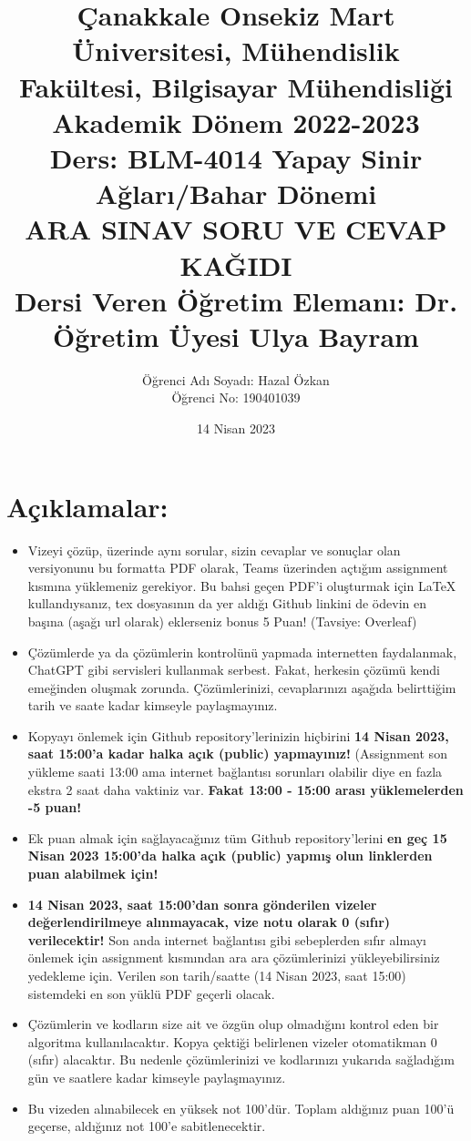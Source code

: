 \documentclass[11pt]{article}
\title{Çanakkale Onsekiz Mart Üniversitesi, Mühendislik Fakültesi, Bilgisayar Mühendisliği Akademik Dönem 2022-2023\\
Ders: BLM-4014 Yapay Sinir Ağları/Bahar Dönemi\\ 
ARA SINAV SORU VE CEVAP KAĞIDI\\
Dersi Veren Öğretim Elemanı: Dr. Öğretim Üyesi Ulya Bayram}
\author{%
\begin{minipage}{\textwidth}
\raggedright
Öğrenci Adı Soyadı: Hazal Özkan\\ %
Öğrenci No: 190401039
\end{minipage}%
}
\date{14 Nisan 2023}
\begin{document}
\maketitle

\vspace{-.5in}
\section*{Açıklamalar:}
\begin{itemize}
    \item Vizeyi çözüp, üzerinde aynı sorular, sizin cevaplar ve sonuçlar olan versiyonunu bu formatta PDF olarak, Teams üzerinden açtığım assignment kısmına yüklemeniz gerekiyor. Bu bahsi geçen PDF'i oluşturmak için LaTeX kullandıysanız, tex dosyasının da yer aldığı Github linkini de ödevin en başına (aşağı url olarak) eklerseniz bonus 5 Puan! (Tavsiye: Overleaf)
    \item Çözümlerde ya da çözümlerin kontrolünü yapmada internetten faydalanmak, ChatGPT gibi servisleri kullanmak serbest. Fakat, herkesin çözümü kendi emeğinden oluşmak zorunda. Çözümlerinizi, cevaplarınızı aşağıda belirttiğim tarih ve saate kadar kimseyle paylaşmayınız. 
    \item Kopyayı önlemek için Github repository'lerinizin hiçbirini \textbf{14 Nisan 2023, saat 15:00'a kadar halka açık (public) yapmayınız!} (Assignment son yükleme saati 13:00 ama internet bağlantısı sorunları olabilir diye en fazla ekstra 2 saat daha vaktiniz var. \textbf{Fakat 13:00 - 15:00 arası yüklemelerden -5 puan!}
    \item Ek puan almak için sağlayacağınız tüm Github repository'lerini \textbf{en geç 15 Nisan 2023 15:00'da halka açık (public) yapmış olun linklerden puan alabilmek için!}
    \item \textbf{14 Nisan 2023, saat 15:00'dan sonra gönderilen vizeler değerlendirilmeye alınmayacak, vize notu olarak 0 (sıfır) verilecektir!} Son anda internet bağlantısı gibi sebeplerden sıfır almayı önlemek için assignment kısmından ara ara çözümlerinizi yükleyebilirsiniz yedekleme için. Verilen son tarih/saatte (14 Nisan 2023, saat 15:00) sistemdeki en son yüklü PDF geçerli olacak.
    \item Çözümlerin ve kodların size ait ve özgün olup olmadığını kontrol eden bir algoritma kullanılacaktır. Kopya çektiği belirlenen vizeler otomatikman 0 (sıfır) alacaktır. Bu nedenle çözümlerinizi ve kodlarınızı yukarıda sağladığım gün ve saatlere kadar kimseyle paylaşmayınız.
    \item Bu vizeden alınabilecek en yüksek not 100'dür. Toplam aldığınız puan 100'ü geçerse, aldığınız not 100'e sabitlenecektir.

\end{itemize}
\end{document}
